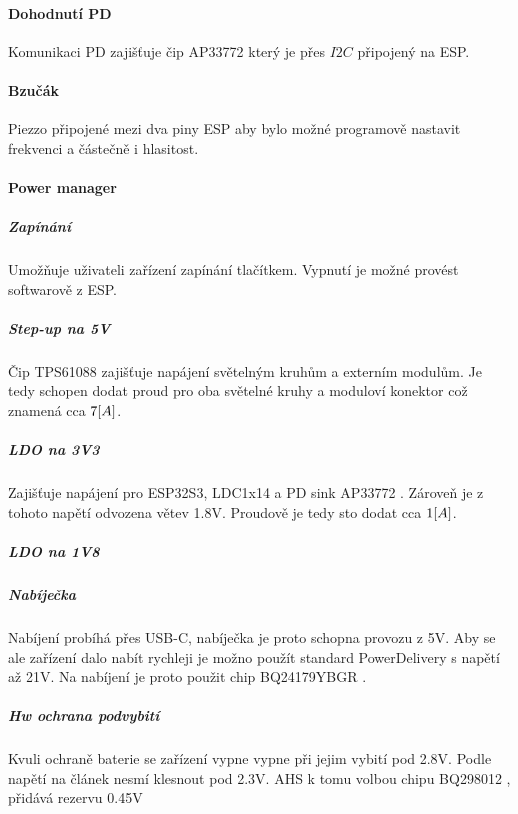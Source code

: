 \paragraph{Dohodnutí PD}
Komunikaci PD zajišťuje čip AP33772 \cite{AP33772} který je přes \(I2C\) připojený na ESP.

\paragraph{Bzučák}
Piezzo připojené mezi dva piny ESP aby bylo možné programově nastavit frekvenci a částečně i hlasitost.

\paragraph{Power manager}
\subparagraph{Zapínání}
Umožňuje uživateli zařízení zapínání tlačítkem.
Vypnutí je možné provést softwarově z ESP.

\subparagraph{Step-up na 5V}
Čip TPS61088 \cite{TPS61088} zajišťuje napájení světelným kruhům a externím modulům.
Je tedy schopen dodat proud pro oba světelné kruhy a moduloví konektor což znamená cca \(7\-[A]\).

\subparagraph{LDO na 3V3}
Zajišťuje napájení pro ESP32S3, LDC1x14 a PD sink AP33772 \cite{AP33772}.
Zároveň je z tohoto napětí odvozena větev 1.8V.
Proudově je tedy sto dodat cca \(1\-[A]\).

\subparagraph{LDO na 1V8}


\subparagraph{Nabíječka}
Nabíjení probíhá přes USB-C, nabíječka je proto schopna provozu z 5V.
Aby se ale zařízení dalo nabít rychleji je možno použít standard PowerDelivery s napětí až 21V.
Na nabíjení je proto použit chip BQ24179YBGR \cite{BQ24179}.

\subparagraph{Hw ochrana podvybití}
Kvuli ochraně baterie se zařízení vypne vypne při jejim vybití pod 2.8V.
Podle \cite{PanasonicLiOntReport} napětí na článek nesmí klesnout pod 2.3V. 
AHS k tomu volbou chipu BQ298012 \cite{BQ298012}, přidává rezervu 0.45V 






